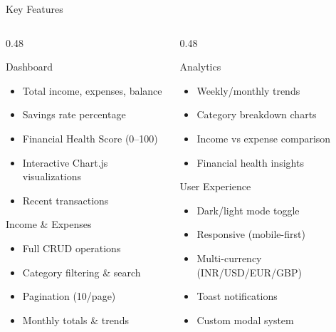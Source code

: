 \documentclass[aspectratio=169, 12pt]{beamer}
\begin{document}
\begin{frame}{Key Features}

\begin{columns}[T]
\begin{column}{0.48\textwidth}

\begin{block}{Dashboard}
\begin{itemize}\itemsep=1pt
    \item Total income, expenses, balance
    \item Savings rate percentage
    \item Financial Health Score (0--100)
    \item Interactive Chart.js visualizations
    \item Recent transactions
\end{itemize}
\end{block}

\begin{block}{Income \& Expenses}
\begin{itemize}\itemsep=1pt
    \item Full CRUD operations
    \item Category filtering \& search
    \item Pagination (10/page)
    \item Monthly totals \& trends
\end{itemize}
\end{block}

\end{column}
\begin{column}{0.48\textwidth}

\begin{block}{Analytics}
\begin{itemize}\itemsep=1pt
    \item Weekly/monthly trends
    \item Category breakdown charts
    \item Income vs expense comparison
    \item Financial health insights
\end{itemize}
\end{block}

\begin{block}{User Experience}
\begin{itemize}\itemsep=1pt
    \item Dark/light mode toggle
    \item Responsive (mobile-first)
    \item Multi-currency (INR/USD/EUR/GBP)
    \item Toast notifications
    \item Custom modal system
\end{itemize}
\end{block}

\end{column}
\end{columns}
\end{frame}
\end{document}
